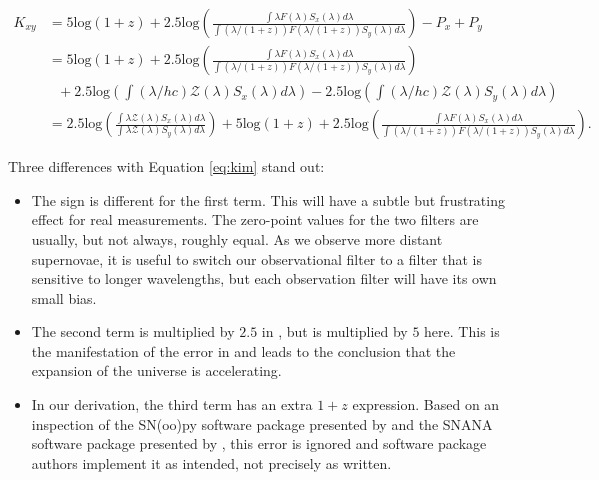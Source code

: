 \documentclass[aps,prl,reprint,amsmath]{revtex4-2}
\begin{document}
\begin{equation}
\begin{aligned}
  K_{xy} &= 5 \text{log} (1 + z)
            + 2.5 \text{log} \left(
              \frac{\int \lambda F(\lambda) S_x(\lambda) d\lambda}
                   {\int (\lambda / (1+z)) F(\lambda / (1+z)) S_y(\lambda) d\lambda} \right)
            - P_x + P_y \\
         &= 5 \text{log} (1 + z)
            + 2.5 \text{log} \left(
              \frac{\int \lambda F(\lambda) S_x(\lambda) d\lambda}
                   {\int (\lambda / (1+z)) F(\lambda / (1+z)) S_y(\lambda) d\lambda} \right) \\ &\ \ \
            + 2.5 \text{log} \left( \int (\lambda / hc) \mathcal{Z}(\lambda) S_x(\lambda) d\lambda \right)
            - 2.5 \text{log} \left( \int (\lambda / hc) \mathcal{Z}(\lambda) S_y(\lambda) d\lambda \right) \\
         &= 2.5 \text{log} \left(
              \frac{\int \lambda \mathcal{Z}(\lambda) S_x(\lambda) d\lambda}
                   {\int \lambda \mathcal{Z}(\lambda) S_y(\lambda) d\lambda}
             \right)
            + 5 \text{log} (1 + z)
            + 2.5 \text{log} \left(
              \frac{\int \lambda F(\lambda) S_x(\lambda) d\lambda}
                   {\int (\lambda / (1+z)) F(\lambda / (1+z)) S_y(\lambda) d\lambda} \right) .
\end{aligned}
\end{equation}

Three differences with Equation \ref{eq:kim} stand out:

\begin{itemize}
  \item The sign is different for the first term. This will have a subtle but
  frustrating effect for real measurements. The zero-point values for the two
  filters are usually, but not always, roughly equal. As we observe more
  distant supernovae, it is useful to switch our observational filter to a
  filter that is sensitive to longer wavelengths, but each observation filter will
  have its own small bias.

  \item The second term is multiplied by $2.5$ in \citet{kim1996}, but is
  multiplied by $5$ here. This is the manifestation of the error in
  \citet{tolman1930} and leads to the conclusion that the expansion of the
  universe is accelerating.

  \item In our derivation, the third term has an extra $1 + z$ expression.
  Based on an inspection of the SN(oo)py software package presented by
  \citet{burns2010} and the SNANA software package presented by
  \citet{kessler2009}, this error is ignored and software package authors
  implement it as intended, not precisely as written.
\end{itemize}
\end{document}
